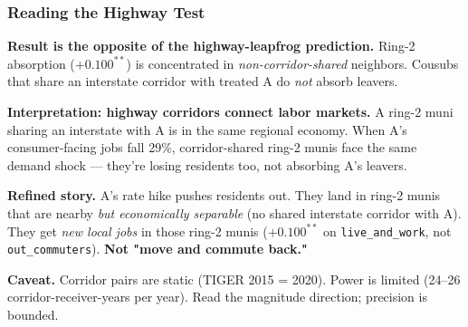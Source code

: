 \documentclass[xcolor = x11names, compress, aspectratio = 169]{beamer}
\begin{document}
    \begin{frame}
    \frametitle{Reading the Highway Test}
        \footnotesize
        \textbf{Result is the opposite of the highway-leapfrog prediction.}
        Ring-2 absorption ($+0.100^{**}$) is concentrated in
        \emph{non-corridor-shared} neighbors. Cousubs that share an
        interstate corridor with treated A do \emph{not} absorb leavers.
        \medskip

        \textbf{Interpretation: highway corridors connect labor markets.}
        A ring-2 muni sharing an interstate with A is in the same regional
        economy. When A's consumer-facing jobs fall 29\%, corridor-shared
        ring-2 munis face the same demand shock --- they're losing
        residents too, not absorbing A's leavers.
        \medskip

        \textbf{Refined story.} A's rate hike pushes residents out. They
        land in ring-2 munis that are nearby \emph{but economically separable}
        (no shared interstate corridor with A). They get \emph{new local jobs}
        in those ring-2 munis ($+0.100^{**}$ on \texttt{live\_and\_work},
        not \texttt{out\_commuters}). \textbf{Not "move and commute back."}
        \medskip

        \textbf{Caveat.} Corridor pairs are static (TIGER 2015 = 2020).
        Power is limited (24--26 corridor-receiver-years per year). Read
        the magnitude direction; precision is bounded.
    \end{frame}
\end{document}
